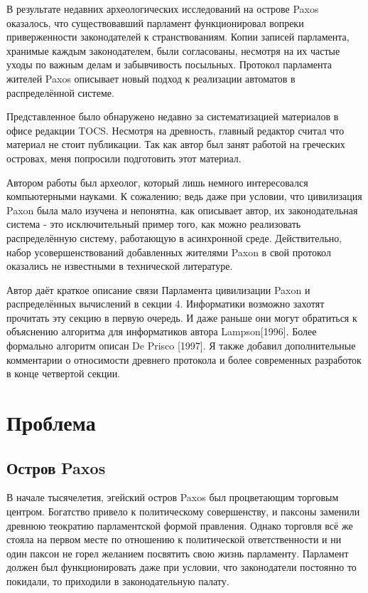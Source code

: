 В результате недавних археологических исследований на острове Paxos оказалось, что существовавший парламент функционировал вопреки приверженности законодателей к странствованиям. Копии записей парламента, хранимые каждым законодателем, были согласованы, несмотря на их частые уходы по важным делам и забывчивость посыльных. Протокол парламента жителей Paxos описывает новый подход к реализации автоматов в распределённой системе.

Представленное было обнаружено недавно за систематизацией материалов в офисе редакции TOCS. Несмотря на древность, главный редактор считал что материал не стоит публикации. Так как автор был занят работой на греческих островах, меня попросили подготовить этот материал.

Автором работы был археолог, который лишь немного интересовался компьютерными науками. К сожалению; ведь даже при условии, что цивилизация Paxon была мало изучена и непонятна, как описывает автор, их законодательная система - это исключительный пример того, как можно реализовать распределённую систему, работающую в асинхронной среде. Действительно, набор усовершенствований добавленных жителями Paxon в свой протокол оказались не известными в технической литературе.

Автор даёт краткое описание связи Парламента цивилизации Paxon и распределённых вычислений в секции 4. Информатики возможно захотят прочитать эту секцию в первую очередь. И даже раньше они могут обратиться к объяснению алгоритма для информатиков автора Lampson[1996]. Более формально алгоритм описан De Prisco [1997]. Я также добавил дополнительные комментарии о относимости древнего протокола и более современных разработок в конце четвертой секции.


\section{Проблема}
\subsection{Остров Paxos}

В начале тысячелетия, эгейский остров Paxos был процветающим торговым центром. Богатство привело к политическому совершенству, и паксоны заменили древнюю теократию парламентской формой правления. Однако торговля всё же стояла на первом месте по отношению к политической ответственности и ни один паксон не горел желанием посвятить свою жизнь парламенту. Парламент должен был функционировать даже при условии, что законодатели постоянно то покидали, то приходили в законодательную палату.

